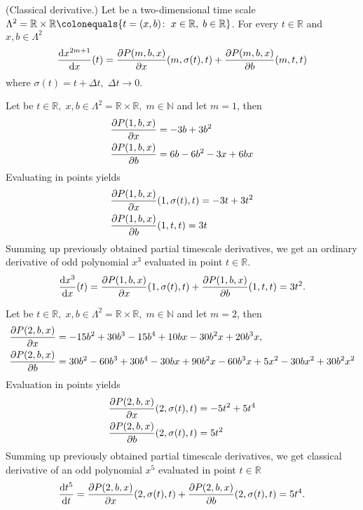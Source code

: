 \begin{cor}
    \label{derivative_case}
    (Classical derivative.)
    Let be a two-dimensional time scale
    $\Lambda^2 = \mathbb{R} \times \mathbb{R} \colonequals \{t=(x, b) \colon \; x\in \mathbb{R}, \; b\in\mathbb{R} \}$.
    For every $t\in\mathbb{R}$ and $x,b\in \Lambda^2$
    \begin{align*}
        \odv{x^{2m+1}}{x} (t)
        = \pdv{\polynomialP{m}{b}{x}}{x} (m, \sigma(t), t)
        + \pdv{\polynomialP{m}{b}{x}}{b} (m, t, t)
    \end{align*}
    where $\sigma(t) = t + \Delta t, \; \Delta t \to 0.$
\end{cor}
\begin{examp}
    \label{time_scale_r_example_1}
    Let be $t\in\mathbb{R}, \; x,b\in \Lambda^2 = \mathbb{R} \times \mathbb{R}, \; m\in\mathbb{N}$ and let $m=1$, then
    \begin{align*}
        \pdv{P ( 1, b, x )}{x} &= -3 b + 3 b^2 \\
        \pdv{P ( 1, b, x )}{b} &= 6 b - 6 b^2 - 3 x + 6 b x
    \end{align*}
    Evaluating in points yields
    \begin{align*}
        &\pdv{P ( 1, b, x )}{x} (1, \sigma(t), t) = -3t + 3t^2 \\
        &\pdv{P ( 1, b, x )}{b} (1, t, t) = 3t
    \end{align*}
    Summing up previously obtained partial timescale derivatives, we get an ordinary derivative of odd polynomial
    $x^{3}$ evaluated in point $t \in \mathbb{R}$.
    \begin{align*}
        \odv{x^3}{x} (t)
        = \pdv{\polynomialP{1}{b}{x}}{x} (1, \sigma(t), t)
        + \pdv{\polynomialP{1}{b}{x}}{b} (1, t, t)
        = 3t^2.
    \end{align*}
\end{examp}
\begin{examp}
    \label{time_scale_r_example_2}
    Let be $t\in\mathbb{R}, \; x,b\in \Lambda^2 = \mathbb{R} \times \mathbb{R}, \; m\in\mathbb{N}$ and let $m=2$, then
    \begin{align*}
        &\pdv{P ( 2, b, x )}{x} = -15 b^2 + 30 b^3 - 15 b^4 + 10 b x - 30 b^2 x + 20 b^3 x, \\
        &\pdv{P ( 2, b, x )}{b} = 30 b^2 - 60 b^3 + 30 b^4 - 30 b x + 90 b^2 x - 60 b^3 x + 5 x^2 - 30 b x^2 + 30 b^2 x^2
    \end{align*}
    Evaluation in points yields
    \begin{align*}
        &\pdv{P ( 2, b, x )}{x} (2, \sigma(t), t) = -5 t^2 + 5 t^4 \\
        &\pdv{P ( 2, b, x )}{b} (2, \sigma(t), t)        = 5 t^2
    \end{align*}
    Summing up previously obtained partial timescale derivatives, we get classical derivative of an odd polynomial
    $x^5$ evaluated in point $t\in\mathbb{R}$
    \begin{align*}
        \odv{t^5}{t}
        = \pdv{\polynomialP{2}{b}{x}}{x} (2, \sigma(t), t)
        + \pdv{\polynomialP{2}{b}{x}}{b} (2, \sigma(t), t)
        = 5t^4.
    \end{align*}
\end{examp}
